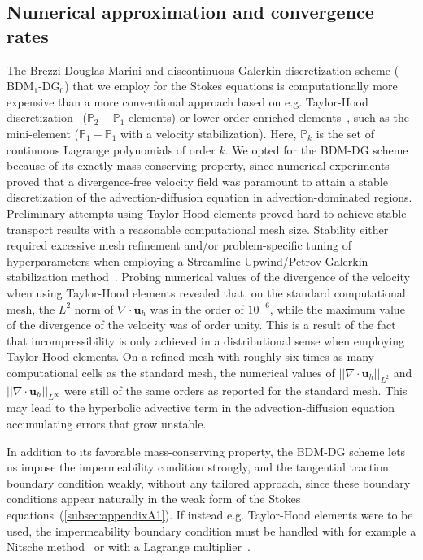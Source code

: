 \documentclass[fleqn]{wlscirep}
\newcommand{\normltwo}[1]{{ \vert\vert#1\vert\vert}_{L^2}}
\newcommand{\normlinf}[1]{{\vert\vert#1\vert\vert}_{L^{\infty}}}
\newcommand{\uu}{\mathbf{u}}
\begin{document}
\subsection*{Numerical approximation and convergence rates}
The Brezzi-Douglas-Marini and discontinuous Galerkin discretization scheme ($\mathrm{BDM}_1$-$\mathrm{DG}_0$) that we employ for the Stokes equations is computationally more expensive than a more conventional approach based on e.g. Taylor-Hood discretization~\cite{Stenberg1990ErrorProblem} ($\mathbb{P}_2-\mathbb{P}_1$ elements) or lower-order enriched elements~\cite{Brezzi2011MixedMethods}, such as the mini-element ($\mathbb{P}_1-\mathbb{P}_1$ with a velocity stabilization). Here, $\mathbb{P}_k$ is the set of continuous Lagrange polynomials of order $k$. We opted for the BDM-DG scheme because of its exactly-mass-conserving property, since numerical experiments proved that a divergence-free velocity field was  paramount to attain a stable discretization of the advection-diffusion equation in advection-dominated regions. Preliminary attempts using Taylor-Hood elements proved hard to achieve stable transport results with a reasonable computational mesh size. Stability either required excessive mesh refinement and/or problem-specific tuning of hyperparameters when employing a Streamline-Upwind/Petrov Galerkin stabilization method~\cite{Franca1992StabilizedModel}. Probing numerical values of the divergence of the velocity when using Taylor-Hood elements revealed that, on the standard computational mesh, the $L^2$ norm of $\nabla\cdot\uu_h$ was in the order of $10^{-6}$, while the maximum value of the divergence of the velocity was of order unity. This is a result of the fact that incompressibility is only achieved in a distributional sense when employing Taylor-Hood elements. On a refined mesh with roughly six times as many computational cells as the standard mesh, the numerical values of $\normltwo{\nabla\cdot\uu_h}$ and $\normlinf{\nabla\cdot\uu_h}$ were still of the same orders as reported for the standard mesh. This may lead to the hyperbolic advective term in the advection-diffusion equation accumulating errors that grow unstable. 

In addition to its favorable mass-conserving property, the BDM-DG scheme lets us impose the impermeability condition strongly, and the tangential traction boundary condition weakly, without any tailored approach, since these boundary conditions appear naturally in the weak form of the Stokes equations~(\cref{subsec:appendixA1}). If instead e.g. Taylor-Hood elements were to be used, the impermeability boundary condition must be handled with for example a Nitsche method~\cite{Nitsche1971UberSind} or with a Lagrange multiplier~\cite{Babuska1973TheMultipliers, Bertoluzza2017BoundaryHemodynamics}. 
\end{document}
